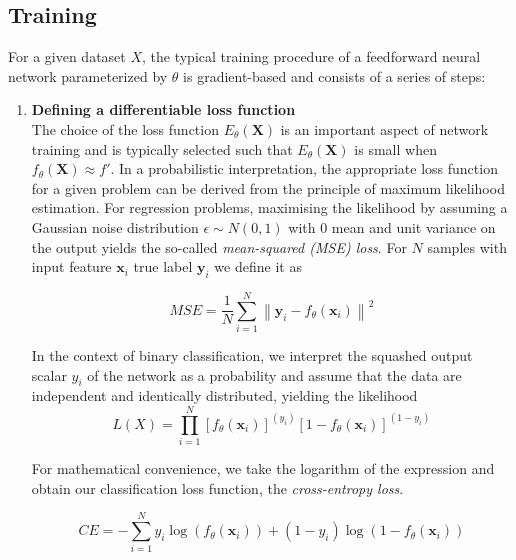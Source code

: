 \documentclass[bsc,frontabs,twoside,singlespacing,parskip,deptreport]{infthesis}     %
\let\Oldsubsection\subsection
\renewcommand{\subsection}{\FloatBarrier\Oldsubsection}
\begin{document}
\subsection{Training}
For a given dataset \(X\), the typical training procedure of a feedforward neural network parameterized by \(\theta\) is gradient-based and consists of a series of steps: \\
\begin{enumerate}
    \item{ \bf{Defining a differentiable loss function}} \vspace{0.2cm} \\
    The choice of the loss function \(E_{\theta}(\mathbf{X})\) is an important aspect of network training and is typically selected such that \(E_{\theta}(\mathbf{X})\) is small when \(f_{\theta}(\mathbf{X}) \approx f'\). In a probabilistic interpretation, the appropriate loss function for a given problem can be derived from the principle of maximum likelihood estimation. For regression problems, maximising the likelihood by assuming a Gaussian noise distribution \(\epsilon\sim N(0,1)\) with 0 mean and unit variance on the output yields the so-called \textit{mean-squared (MSE) loss}. For \(N\) samples with input feature \(\mathbf{x}_{i}\) true label \(\mathbf{y}_{i}\) we define it as
    
\begin{equation}
MSE=\frac{1}{N} \sum_{i=1}^{N}\left\|\mathbf{y}_{i}-f_{\theta}(\mathbf{x}_{i}) \right\|^{2}
\end{equation}

In the context of binary classification, we interpret the squashed output scalar \({y}_{i}\) of the network as a probability and assume that the data are independent and identically distributed, yielding the likelihood
\begin{equation}
L(X)=\prod_{i=1}^{N}\left[f_{\theta}\left(\mathbf{x}_{i}\right)\right]^{\left({y}_{i}\right)}\left[1-f_{\theta}\left(\mathbf{x}_{i}\right)\right]^{\left(1-{y}_{i}\right)}
\end{equation}
    
For mathematical convenience, we take the logarithm of the expression and obtain our classification loss function, the \textit{cross-entropy loss}.

\begin{equation}
CE = -\sum_{i=1}^{N} y_{i} \log \left(f_{\theta}\left(\mathbf{x}_{i}\right)\right)+\left(1-y_{i}\right) \log \left(1-f_{\theta}\left(\mathbf{x}_{i}\right)\right)
\end{equation}


\end{enumerate}
\end{document}

